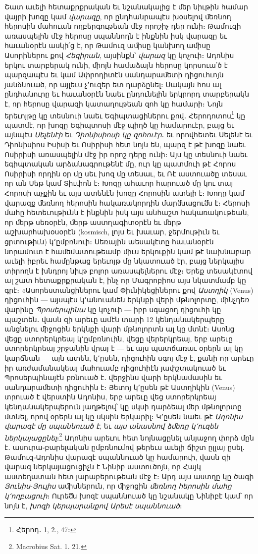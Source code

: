 \documentclass{article}
\begin{document}
{Շատ աւելի հետաքրքրական եւ նշանակալից է ﬔր նիւթին համար վայրի խոզը կամ \emph{վարազը}, որ ընդհանրապէս խօսելով ﬔռնող հերոսին մահուան ողբերգութեան մէջ որոշիչ դեր ունի։ Թամուզի առասպելին մէջ հերոսը սպաննողն է ինքնին իսկ վարազը եւ հաւանօրէն ասկի՛ց է, որ Թամուզ աﬕսը կանխող աﬕսը Ասորիներու քով \emph{Հեզիրան}, այսինքն՝ \emph{վարազ} կը կոչուի։ Ադոնիս երկու տարբերակ ունի, ﬕոյն համաձայն հերոսը կորսուա՛ծ է պարզապէս եւ կամ Ափրոդիտէն սանդարաﬔտի դիցուհւոյն յանձնուած, որ այլեւս չ՚ուզեր ետ դարձընել։ Սակայն հոս ալ ընդհանուրը եւ հաւանօրէն նաեւ ընդունելին երկրորդ տարբերակն է, որ հերոսը վարազի կատաղութեան զոհ կը համարի։ Նոյն երեւոյթը կը տեսնուի նաեւ Եգիպտացիներու քով․ Հերոդոտոս\footnote{Հերոդ․ 1, 2., 47։} կը պատմէ, որ խոզը Եգիպտոսի մէջ պիղծ կը համարուէր, բայց եւ այնպէս \emph{Սելենէի} եւ \emph{Դիոնիսիոսի կը զոհուէր}․ եւ որովհետեւ Սելենէ եւ Դիոնիսիոս Իսիսի եւ Ոսիրիսի հետ նոյն են, պարզ է թէ խոզը նաեւ Ոսիրիսի առասպելին մէջ իր որոշ դերը ունի։ Այս կը տեսնուի նաեւ եգիպտական արձանագրութենէ մը, ուր կը պատմուի թէ Հորոս Ոսիրիսի որդին օր մը սեւ խոզ մը տեսաւ, եւ Ռէ աստուածը տեսաւ որ ան Սեթ կամ Տիւփոն է։ Խոզը ահաւոր հարուած մը կու տայ Հորոսի աչքին եւ այս ատենէն խոզը Հորոսին ատելի է։ Խողը կամ վարազք ﬔռնող հերոսին հակառակորդին մարﬓացուﬓ է։ Հերոսի մահը հետեւութիւնն է ինքնին իսկ այս անհաշտ հակառակութեան, որ ﬔրթ սեռօրէն, ﬔրթ աստղագիտօրէն եւ ﬔրթ աշխարհախօսօրէն (kosmisch, լոյս եւ խաւար, ջերմութիւն եւ ցրտութիւն) կ՚ըմբռնուի։ Սեռային աեսակէտը հաւանօրէն նորամուտ է հաﬔմատութեամբ ﬕւս երկուքին կամ թէ նախնաբար աւելի իբրեւ համընթաց երեւոյթ մը նկատուած էր, բայց ներկայիս տիրողն է խնդրոյ նիւթ բոլոր առասպելներու մէջ։ Երեք տեսակէտով ալ շատ հետաքրքրական է, ինչ որ Մագրոբիոս այս նկատմամբ կը գրէ։ «Ասորեստանցիներու կամ Փիւնիկեցիներու քով \emph{Աստղիկ} (Venus) դիցուհին — այսպէս կ՚անուանեն երկնքի վերի մթնոլորտը, ﬕնչդեռ վարինը \emph{Պրոսերպինա} կը կոչուի — իբր սգացող դիցուհի կը պաշտեն․ վասն զի արեւը ամէն տարի 12 կենդանակերպերը անցնելու ﬕջոցին երկնքի վարի մթնոլորտն ալ կը մտնէ։ Ասոնց վեցը ստորերկրեայ կ՚ըմբռնուին, վեցը վերերկրեայ, երբ արեւը ստորերկրեայ շրջանին վրայ է — եւ այս պատճառաւ օրերն ալ կը կարճնան — այն ատեն, կ՚ըսեն, դիցուհին սգոյ մէջ է, քանի որ արեւը իր առժամանակեայ մահուամբ դիցուհիէն յափշտակուած եւ Պրոսերպինայէն բռնուած է․ վերջինս վարի երկնամասին եւ սանդարաﬔտի դիցուհին է։ Յետոյ կ՚ըսեն թէ Աստղիկին (Venus) տրուած է վերստին Ադոնիս, երբ արեւը վեց ստորերկրեայ կենդանակերպերուն յաղթելով՝ կը սկսի դարձեալ ﬔր մթնոլորտը մտնել, որով օրերն ալ կը սկսին երկարիլ։ Կ՚ըսեն նաեւ թէ \emph{Ադոնիս վարազէ մը սպաննուած է}, եւ \emph{այս անասնով ձﬔռը կ՚ուզեն ներկայացընել}։\footnote{Macrobius Sat. 1. 21.} Ադոնիս արեւու հետ նոյնացընել անյաջող փորձ մըն է․ ասուրա֊բարելական ըմբռնումով թերեւս աւելի ճիշտ ըլլայ ըսել․ Թամուզ֊Ադոնիս վարազէ սպաննուած կը համարուի, վասն զի վարազ ներկայացուցիչն է Նինիբ աստուծոյն, որ Հայկ աստեղատան հետ յարաբերութեան մէջ է։ Արդ այս աստղը կը ծագի \emph{Յունիս}֊\emph{Յուլիս} աﬕսներուն, որ ﬕջոցին \emph{ﬔռնող հերոսին մահը կ՚ողբացուի}։ Ուրեﬓ խոզէ սպաննուած կը նշանակը Նինիբէ կամ՝ որ նոյն է, \emph{խոզի կերպարանքով Արեսէ սպաննուած}։

}
\end{document}
